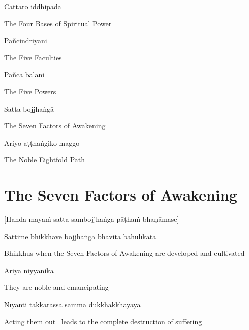 Cattāro iddhipādā

\begin{english}
  The Four Bases of Spiritual Power
\end{english}

Pañcindriyāni

\begin{english}
  The Five Faculties
\end{english}

Pañca balāni

\begin{english}
  The Five Powers
\end{english}

Satta bojjhaṅgā

\begin{english}
  The Seven Factors of Awakening
\end{english}

Ariyo aṭṭhaṅgiko maggo

\begin{english}
  The Noble Eightfold Path
\end{english}

\suttaRef{[DN 16]}


\section{The Seven Factors of Awakening}
\label{seven-factors-of-awakening}

\begin{center}
  [Handa mayaṁ satta-sambojjhaṅga-pāṭhaṁ bhaṇāmase]
\end{center}

Sattime bhikkhave bojjhaṅgā bhāvitā bahulīkatā

\begin{english}
  Bhikkhus when the Seven Factors of Awakening are developed and cultivated
\end{english}

Ariyā niyyānikā

\begin{english}
  They are noble and emancipating
\end{english}

Nīyanti takkarassa sammā dukkhakkhayāya

\begin{english}
  Acting them out \breathmark\ leads to the complete destruction of suffering
\end{english}

